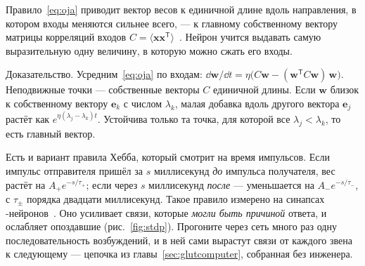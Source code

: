\begin{keyblock}
\begin{proposition}
\label{prop:oja}
Правило~\eqref{eq:oja} приводит вектор весов к единичной длине вдоль направления, в котором входы меняются сильнее всего, --- к главному собственному вектору матрицы корреляций входов $C=\langle\mathbf x\mathbf x^{\mathsf T}\rangle$~\cite{Oja1982}. Нейрон учится выдавать самую выразительную одну величину, в которую можно сжать его входы.
\end{proposition}
\end{keyblock}

Доказательство. Усредним~\eqref{eq:oja} по входам: $\dd\mathbf w/\dd t=\eta\bigl(C\mathbf w-(\mathbf w^{\mathsf T}C\mathbf w)\,\mathbf w\bigr)$. Неподвижные точки --- собственные векторы $C$ единичной длины. Если $\mathbf w$ близок к собственному вектору $\mathbf e_k$ с числом $\lambda_k$, малая добавка вдоль другого вектора $\mathbf e_j$ растёт как $e^{\eta(\lambda_j-\lambda_k)t}$. Устойчива только та точка, для которой все $\lambda_j<\lambda_k$, то есть главный вектор.

Есть и вариант правила Хебба, который смотрит на время импульсов. Если импульс отправителя пришёл за $s$ миллисекунд \emph{до} импульса получателя, вес растёт на $A_+e^{-s/\tau_+}$; если через $s$ миллисекунд \emph{после} --- уменьшается на $A_-e^{-s/\tau_-}$, с $\tau_\pm$ порядка двадцати миллисекунд. Такое правило измерено на синапсах -нейронов~\cite{BiPoo1998}. Оно усиливает связи, которые \emph{могли быть причиной} ответа, и ослабляет опоздавшие (рис.~\ref{fig:stdp}). Прогоните через сеть много раз одну последовательность возбуждений, и в ней сами вырастут связи от каждого звена к следующему --- цепочка из главы~\ref{sec:glutcomputer}, собранная без инженера.

